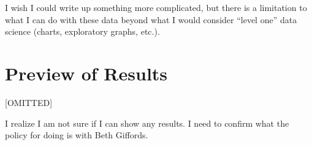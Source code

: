 \documentclass[12pt,letterpaperpaper,]{book}
\begin{document}
I wish I could write up something more complicated, but there is a
limitation to what I can do with these data beyond what I would consider
``level one'' data science (charts, exploratory graphs, etc.).

\hypertarget{preview-3}{\section*{Preview of Results}\label{preview-3}}

{[}OMITTED{]}

I realize I am not sure if I can show any results. I need to confirm
what the policy for doing is with Beth Giffords.



\backmatter
\printindex
\end{document}
